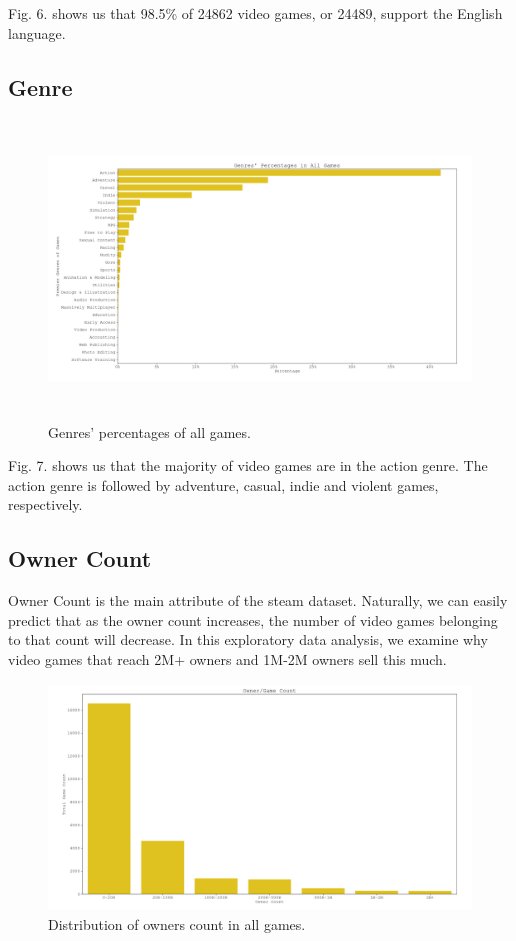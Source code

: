 \documentclass[conference]{IEEEtran}
\begin{document}
Fig. 6. shows us that 98.5\% of 24862 video games, or 24489, support the English language.

\subsection{Genre}


\begin{figure}[h]
  \centering
  \includegraphics[width=\linewidth,height=7.9cm]{assets-1/genres_dist.png}
  \caption{Genres' percentages of all games.}
  \label{fig:genre1}
\end{figure}

Fig. 7. shows us that the majority of video games are in the action genre. The action genre is followed by adventure, casual, indie and violent games, respectively. \\

\subsection{Owner Count}
Owner Count is the main attribute of the steam dataset. Naturally, we can easily predict that as the owner count increases, the number of video games belonging to that count will decrease. In this exploratory data analysis, we examine why video games that reach 2M+ owners and 1M-2M owners sell this much.

\begin{figure}[h]
  \includegraphics[width=\linewidth, height=6cm]{assets-1/owners_count.png}
  \caption{Distribution of owners count in all games.}
  \label{fig:ownercount1}
\end{figure}
\end{document}
